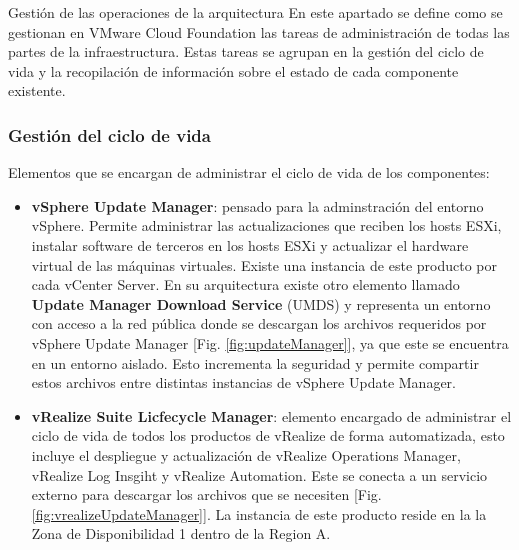 \begin{subsection}{Gestión de las operaciones de la arquitectura}
En este apartado se define como se gestionan en VMware Cloud Foundation las tareas de administración de todas las partes de la infraestructura. Estas tareas se agrupan en la gestión del ciclo de vida y la recopilación de información sobre el estado de cada componente existente.

\subsubsection{Gestión del ciclo de vida}
Elementos que se encargan de administrar el ciclo de vida de los componentes:
\begin{itemize}
    \item \textbf{vSphere Update Manager}: pensado para la adminstración del entorno vSphere. Permite administrar las actualizaciones que reciben los hosts ESXi, instalar software de terceros en los hosts ESXi y actualizar el hardware virtual de las máquinas virtuales. Existe una instancia de este producto por cada vCenter Server. En su arquitectura existe otro elemento llamado \textbf{Update Manager Download Service} (UMDS) y representa un entorno con acceso a la red pública donde se descargan los archivos requeridos por vSphere Update Manager [Fig. \ref{fig:updateManager}], ya que este se encuentra en un entorno aislado. Esto incrementa la seguridad y permite compartir estos archivos entre distintas instancias de vSphere Update Manager.
    
    \item \textbf{vRealize Suite Licfecycle Manager}: elemento encargado de administrar el ciclo de vida de todos los productos de vRealize de forma automatizada, esto incluye el despliegue y actualización de vRealize Operations Manager, vRealize Log Insgiht y vRealize Automation. Este se conecta a un servicio externo para descargar los archivos que se necesiten [Fig. \ref{fig:vrealizeUpdateManager}]. La instancia de este producto reside en la la Zona de Disponibilidad 1 dentro de la Region A.
    
\end{itemize}


\end{subsection}
